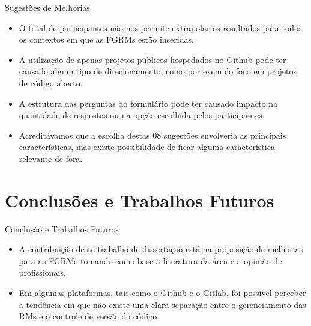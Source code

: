 \documentclass[t,14pt,mathserif]{beamer}
\begin{document}
\begin{frame}{Sugestões de Melhorias}

    \begin{itemize}
        \item O total de participantes não nos permite extrapolar os resultados
            para todos os contextos em que as FGRMs estão inseridas.

        \item A utilização de apenas projetos públicos hospedados no Github pode
            ter causado algum tipo de direcionamento, como por exemplo foco em
            projetos de código aberto.

        \item A estrutura das perguntas do formulário pode ter causado impacto
            na quantidade de respostas ou na opção escolhida pelos
            participantes.

        \item Acreditávamos que a escolha destas 08 sugestões envolveria as
            principais características, mas existe possibilidade de ficar alguma
            característica relevante de fora.
    \end{itemize}

\end{frame}

\section{Conclusões e Trabalhos Futuros}

\begin{frame}{Conclusão e Trabalhos Futuros}
    \begin{itemize}
        \item A contribuição deste trabalho de dissertação está na proposição de
            melhorias para as FGRMs tomando como base a literatura da área e a
            opinião de profissionais.

        \item Em algumas plataformas, tais como o Github e o Gitlab, foi
              possível perceber a tendência em que não existe uma clara separação
              entre o gerenciamento das RMs e o controle de versão do código.

    \end{itemize}
\end{frame}
\end{document}
